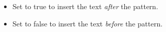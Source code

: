 \begin{itemize}
\item Set to true to insert the text \emph{after} the pattern.
\item Set to false to insert the text \emph{before} the pattern.
\end{itemize}

